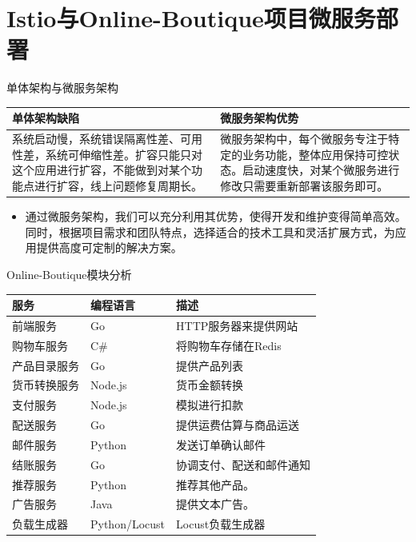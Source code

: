 \documentclass{beamer}
\begin{document}
\section{Istio与Online-Boutique项目微服务部署}
\begin{frame}{单体架构与微服务架构}
	\begin{tabularx}{\textwidth} {X|X}
		\hline
		\textbf{单体架构缺陷} & \textbf{微服务架构优势} \\
		\hline
		系统启动慢，系统错误隔离性差、可用性差，系统可伸缩性差。扩容只能只对这个应用进行扩容，不能做到对某个功能点进行扩容，线上问题修复周期长。 & 微服务架构中，每个微服务专注于特定的业务功能，整体应用保持可控状态。启动速度快，对某个微服务进行修改只需要重新部署该服务即可。 \\
		\hline
	\end{tabularx}
	\begin{itemize}
		\item 通过微服务架构，我们可以充分利用其优势，使得开发和维护变得简单高效。同时，根据项目需求和团队特点，选择适合的技术工具和灵活扩展方式，为应用提供高度可定制的解决方案。
	\end{itemize}
\end{frame}
\begin{frame}{Online-Boutique模块分析}
	\begin{tabularx}{\textwidth}{|l|l|X|}
		\hline
		\textbf{服务} & \textbf{编程语言} & \textbf{描述} \\
		\hline	
		前端服务 & Go & HTTP服务器来提供网站 \\\hline
		购物车服务 & C\# & 将购物车存储在Redis \\\hline
		产品目录服务 & Go & 提供产品列表 \\\hline
		货币转换服务 & Node.js & 货币金额转换 \\\hline
		支付服务 & Node.js & 模拟进行扣款 \\\hline
		配送服务 & Go & 提供运费估算与商品运送\\\hline
		邮件服务 & Python & 发送订单确认邮件\\\hline
		结账服务 & Go & 协调支付、配送和邮件通知 \\\hline
		推荐服务 & Python & 推荐其他产品。 \\\hline
		广告服务 & Java & 提供文本广告。 \\\hline
		负载生成器 & Python/Locust & Locust负载生成器 \\
		\hline
	\end{tabularx}

\end{frame}
\end{document}
